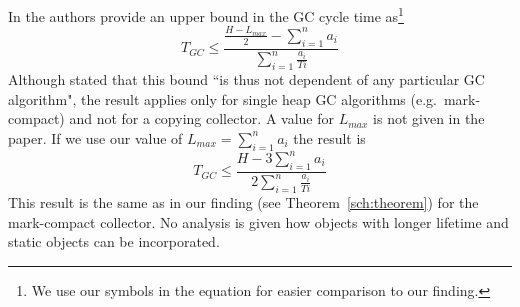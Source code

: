 In \cite{780745} the authors provide an upper bound in the GC cycle
time as\footnote{We use our symbols in the equation for easier
comparison to our finding.}
%
\begin{equation}
\nonumber
    T_{GC} \le \frac{\frac{H-L_{max}}{2}-\sum_{i=1}^{n} a_i}{\sum_{i=1}^{n} \frac{a_i}{Ti}}
\end{equation}
%
Although stated that this bound ``is thus not dependent of any
particular GC algorithm", the result applies only for single heap GC
algorithms (e.g.\ mark-compact) and not for a copying collector. A
value for $L_{max}$ is not given in the paper. If we use our value
of $L_{max} =\sum_{i=1}^{n} a_i$ the result is
%
\begin{equation}
\nonumber
    T_{GC} \le \frac{H-3\sum_{i=1}^{n} a_i}{2\sum_{i=1}^{n} \frac{a_i}{Ti}}
\end{equation}
%
This result is the same as in our finding (see
Theorem~\ref{sch:theorem}) for the mark-compact collector. No
analysis is given how objects with longer lifetime and static
objects can be incorporated.

